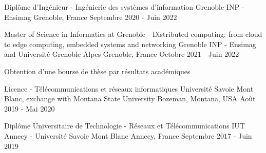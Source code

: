

\begin{cventries}

\cventry
{Diplôme d'Ingénieur - Ingénierie des systèmes d'information} %
{Grenoble INP - Ensimag} %
{Grenoble, France} %
{Septembre 2020 - Juin 2022} %
{
}

\cventry
{Master of Science in Informatics at Grenoble - Distributed computing: from cloud to edge computing, embedded systems and networking} %
{Grenoble INP - Ensimag and Université Grenoble Alpes} %
{Grenoble, France} %
{Octobre 2021 - Juin 2022} %
{
  \begin{cvitems}
    \item Obtention d'une bourse de thèse par résultats académiques
  \end{cvitems}
}

\cventry
{Licence - Télécommunications et réseaux informatiques} %
{Université Savoie Mont Blanc, exchange with Montana State University} %
{Bozeman, Montana, USA} %
{Août 2019 - Mai 2020} %
{
}

\cventry
{Diplôme Universitaire de Technologie - Réseaux et Télécommunications} %
{IUT Annecy - Université Savoie Mont Blanc} %
{Annecy, France} %
{Septembre 2017 - Juin 2019} %
{
}






\end{cventries}
